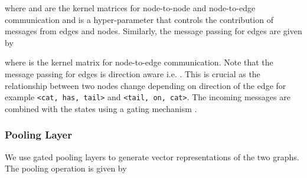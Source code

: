 \documentclass[final]{cvpr}
\begin{document}
where  and  are the kernel matrices for node-to-node and node-to-edge communication and  is a hyper-parameter that controls the contribution of messages from edges and nodes.
Similarly, the message passing for edges are given by

where  is the kernel matrix for node-to-edge communication. Note that the message passing for edges is direction aware i.e. . This is crucial as the relationship between two nodes change depending on direction of the edge for example \texttt{<cat, has, tail>} and \texttt{<tail, on, cat>}.
The incoming messages are combined with the states using a gating mechanism \cite{DBLP:journals/corr/LiTBZ15}.
\subsubsection{Pooling Layer}
We use gated pooling layers to generate vector representations of the two graphs. The pooling operation is given by
\end{document}
